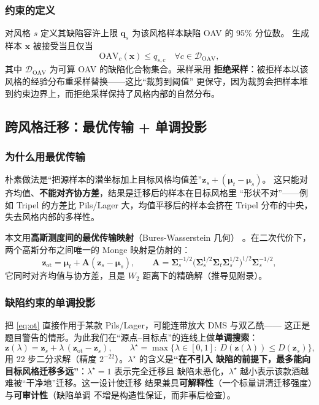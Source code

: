 \subsubsection{约束的定义}

对风格 $s$ 定义其缺陷容许上限 $\bm{q}_s$ 为该风格样本缺陷 OAV 的 95\% 分位数。
生成样本 $\bm{x}$ 被接受当且仅当
\begin{equation}
\mathrm{OAV}_c(\bm{x})\le q_{s,c}\quad \forall c\in\mathcal{D}_{\mathrm{OAV}},
\label{eq:defconstraint}
\end{equation}
其中 $\mathcal{D}_{\mathrm{OAV}}$ 为可算 OAV 的缺陷化合物集合。采样采用
\textbf{拒绝采样}：被拒样本以该风格的经验分布重采样替换——这比“裁剪到阈值”
更保守，因为裁剪会把样本堆到约束边界上，而拒绝采样保持了风格内部的自然分布。

\subsection{跨风格迁移：最优传输 + 单调投影}

\subsubsection{为什么用最优传输}

朴素做法是“把源样本的潜坐标加上目标风格均值差”$\bm{z}_s+(\bm{\mu}_t-\bm{\mu}_s)$。
这只能对齐均值、\textbf{不能对齐协方差}，结果是迁移后的样本在目标风格里
“形状不对”——例如 Tripel 的方差比 Pils/Lager 大，均值平移后的样本会挤在
Tripel 分布的中央，失去风格内部的多样性。

本文用\textbf{高斯测度间的最优传输映射}（Bures-Wasserstein 几何）
\cite{peyre2019}。在二次代价下，两个高斯分布之间唯一的 Monge 映射是仿射的：
\begin{equation}
\bm{z}_{\mathrm{ot}}=\bm{\mu}_t+\bm{A}(\bm{z}_s-\bm{\mu}_s),\qquad
\bm{A}=\bm{\Sigma}_s^{-1/2}\Big(\bm{\Sigma}_s^{1/2}\bm{\Sigma}_t
\bm{\Sigma}_s^{1/2}\Big)^{1/2}\bm{\Sigma}_s^{-1/2},
\label{eq:ot}
\end{equation}
它同时对齐均值与协方差，且是 $W_2$ 距离下的精确解（推导见附录）。

\subsubsection{缺陷约束的单调投影}

把 \eqref{eq:ot} 直接作用于某款 Pils/Lager，可能连带放大 DMS 与双乙酰——
这正是题目警告的情形。为此我们在“源点--目标点”的连线上做\textbf{单调搜索}：
\begin{equation}
\bm{z}(\lambda)=\bm{z}_s+\lambda\,(\bm{z}_{\mathrm{ot}}-\bm{z}_s),\qquad
\lambda^\star=\max\{\lambda\in[0,1]:\ D(\bm{z}(\lambda))\le D(\bm{z}_s)\},
\label{eq:lambda}
\end{equation}
用 22 步二分求解（精度 $2^{-22}$）。$\lambda^\star$ 的含义是\textbf{“在不引入
缺陷的前提下，最多能向目标风格迁移多远”}：$\lambda^\star=1$ 表示完全迁移且
缺陷未恶化，$\lambda^\star$ 越小表示该款酒越难被“干净地”迁移。这一设计使迁移
结果兼具\textbf{可解释性}（一个标量讲清迁移强度）与\textbf{可审计性}（缺陷单调
不增是构造性保证，而非事后检查）。

